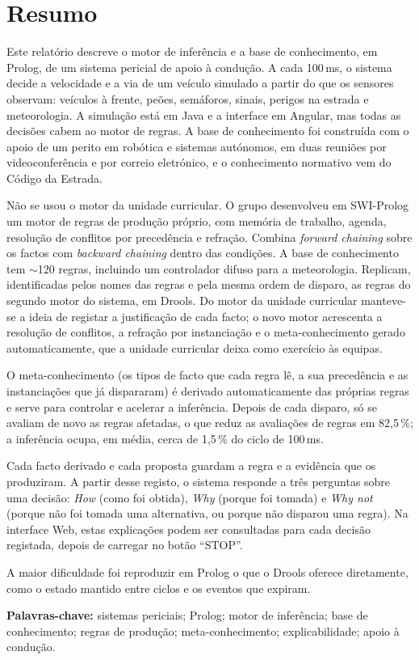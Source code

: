 \chapter*{Resumo}

Este relatório descreve o motor de inferência e a base de conhecimento, em
Prolog, de um sistema pericial de apoio à condução. A cada 100\,ms, o sistema
decide a velocidade e a via de um veículo simulado a partir do que os sensores
observam: veículos à frente, peões, semáforos, sinais, perigos na estrada e
meteorologia. A simulação está em Java e a interface em Angular, mas todas as
decisões cabem ao motor de regras. A base de conhecimento foi construída com o
apoio de um perito em robótica e sistemas autónomos, em duas reuniões por
videoconferência e por correio eletrónico, e o conhecimento normativo vem do
Código da Estrada.

Não se usou o motor da unidade curricular. O grupo desenvolveu em SWI-Prolog um
motor de regras de produção próprio, com memória de trabalho, agenda, resolução
de conflitos por precedência e refração. Combina \emph{forward chaining}
sobre os factos com \emph{backward chaining} dentro das condições. A base de
conhecimento tem $\sim$120 regras, incluindo um controlador difuso para a
meteorologia. Replicam, identificadas pelos nomes das regras e pela mesma ordem
de disparo, as regras do segundo motor do sistema, em Drools. Do motor da unidade
curricular manteve-se a ideia de registar a justificação de cada facto; o novo
motor acrescenta a resolução de conflitos, a refração por instanciação e o
meta-conhecimento gerado automaticamente, que a unidade curricular deixa como
exercício às equipas.

O meta-conhecimento (os tipos de facto que cada regra lê, a sua precedência e as
instanciações que já dispararam) é derivado automaticamente das próprias regras
e serve para controlar e acelerar a inferência. Depois de cada disparo, só se
avaliam de novo as regras afetadas, o que reduz as avaliações de regras em
82,5\,\%; a inferência ocupa, em média, cerca de 1,5\,\% do ciclo de 100\,ms.

Cada facto derivado e cada proposta guardam a regra e a evidência que os
produziram. A partir desse registo, o sistema responde a três perguntas sobre
uma decisão: \emph{How} (como foi obtida), \emph{Why} (porque foi tomada) e
\emph{Why not} (porque não foi tomada uma alternativa, ou porque não disparou
uma regra). Na interface Web, estas explicações podem ser consultadas para cada
decisão registada, depois de carregar no botão \enquote{STOP}.

A maior dificuldade foi reproduzir em Prolog o que o Drools oferece diretamente,
como o estado mantido entre ciclos e os eventos que expiram.

\vspace{0.8cm}
\noindent\textbf{Palavras-chave:} sistemas periciais; Prolog; motor de
inferência; base de conhecimento; regras de produção; meta-conhecimento; explicabilidade;
apoio à condução.

\clearpage

